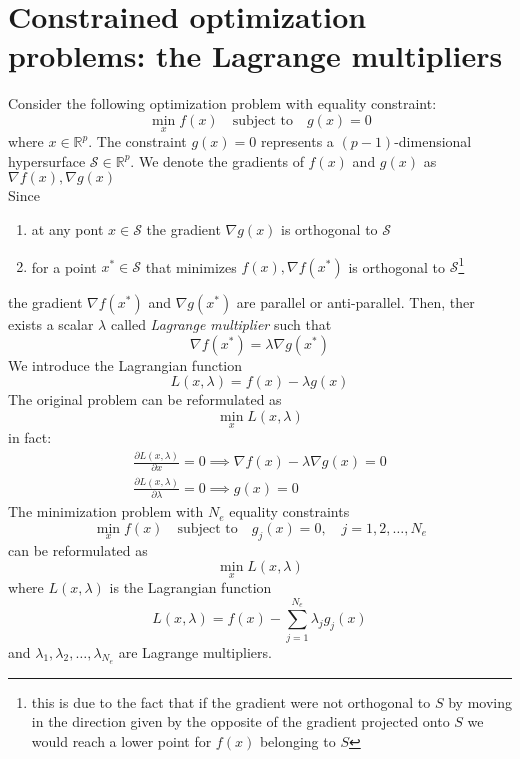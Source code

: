 \documentclass{book}
\theoremstyle{definition}
\theoremstyle{remark}
\theoremstyle{remark}
\begin{document}
\section{Constrained optimization problems: the Lagrange multipliers}
Consider the following optimization problem with equality constraint: 
\[
    \min_xf(x)\quad\text{subject to}\quad g(x)=0
\]
where $x\in \mathbb{R}^p$. The constraint $g(x)=0$ represents a $(p-1)$-dimensional hypersurface
$\mathcal{S}\in \mathbb{R}^p$. We denote the gradients of $f(x)$ and $g(x)$ as $\nabla f(x), \nabla g(x)$\\
Since 
\begin{enumerate}
    \item at any pont $x\in\mathcal{S}$ the gradient $\nabla g(x)$ is orthogonal to $\mathcal{S}$ 
    \item for a point $x^*\in \mathcal{S}$ that minimizes $f(x),\nabla f(x^*)$ is orthogonal to $\mathcal{S}$\footnote{this is due to the fact that if the gradient were not orthogonal to $S$ by moving in the direction given by the opposite of the gradient projected onto $S$ we would reach a lower point for $f(x)$ belonging to $S$}
\end{enumerate}
the gradient $\nabla f(x^*)$ and $\nabla g(x^*)$ are parallel or anti-parallel. Then, ther exists a scalar $\lambda$ called \emph{Lagrange multiplier} such that 
\[
    \nabla f(x^*)=\lambda\nabla g(x^*)
\]
We introduce the Lagrangian function 
\[
    L(x,\lambda)=f(x)-\lambda g(x)
\]
The original problem can be reformulated as 
\[
    \min_x L(x,\lambda)
\]
in fact: 
\begin{gather*}
    \displaystyle\frac{\partial L(x,\lambda)}{\partial x}=0 \implies \nabla f(x)-\lambda\nabla g(x)=0\\
    \displaystyle\frac{\partial L(x,\lambda)}{\partial \lambda}=0 \implies g(x)=0
\end{gather*}
The minimization problem with $N_e$ equality constraints 
\[
    \min_x f(x) \quad \text{subject to}\quad g_j(x)=0, \quad j=1,2,\dots,N_e
\]
can be reformulated as 
\[
    \min_x L(x,\lambda)
\]
where $L(x,\lambda)$ is the Lagrangian function 
\[
    L(x,\lambda)= f(x)-\displaystyle\sum_{j=1}^{N_e}\lambda_jg_j(x)
\]
and $\lambda_1,\lambda_2,\dots,\lambda_{N_e}$ are Lagrange multipliers.
\end{document}
